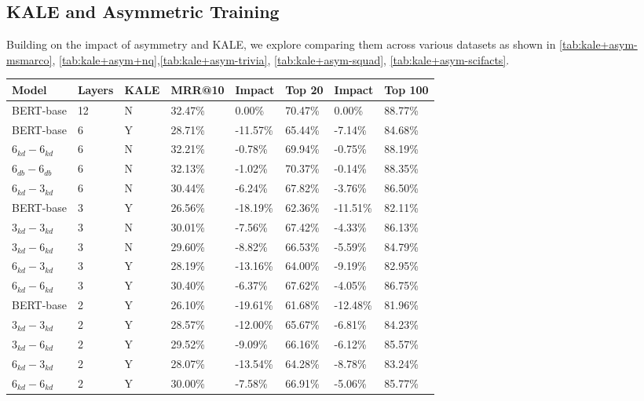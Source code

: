 \subsection{KALE and Asymmetric Training}
\label{sec:kale-asym-full}
Building on the impact of asymmetry and KALE, we explore comparing them across various datasets as shown in \ref{tab:kale+asym-msmarco}, \ref{tab:kale+asym+nq},\ref{tab:kale+asym-trivia}, \ref{tab:kale+asym-squad}, \ref{tab:kale+asym-scifacts}. 
\begin{table*}[!ht]
    \centering
    \begin{tabular}{|l|l|l|l|l|l|l|l|}
    \hline
        Model & Layers & KALE & MRR@10 & Impact & Top 20 & Impact & Top 100 \\ \hline
        BERT-base & 12 & N & 32.47\% & 0.00\% & 70.47\% & 0.00\% & 88.77\% \\ \hline
        BERT-base & 6 & Y & 28.71\% & -11.57\% & 65.44\% & -7.14\% & 84.68\% \\ \hline
        $6_{kd}-6_{kd}$ & 6 & N & 32.21\% & -0.78\% & 69.94\% & -0.75\% & 88.19\% \\ \hline
        $6_{db}-6_{db}$ & 6 & N & 32.13\% & -1.02\% & 70.37\% & -0.14\% & 88.35\% \\ \hline
        $6_{kd}-3_{kd}$ & 6 & N & 30.44\% & -6.24\% & 67.82\% & -3.76\% & 86.50\% \\ \hline
        BERT-base & 3 & Y & 26.56\% & -18.19\% & 62.36\% & -11.51\% & 82.11\% \\ \hline
        $3_{kd}-3_{kd}$ & 3 & N & 30.01\% & -7.56\% & 67.42\% & -4.33\% & 86.13\% \\ \hline
        $3_{kd}-6_{kd}$ & 3 & N & 29.60\% & -8.82\% & 66.53\% & -5.59\% & 84.79\% \\ \hline
        $6_{kd}-3_{kd}$ & 3 & Y & 28.19\% & -13.16\% & 64.00\% & -9.19\% & 82.95\% \\ \hline
        $6_{kd}-6_{kd}$ & 3 & Y & 30.40\% & -6.37\% & 67.62\% & -4.05\% & 86.75\% \\ \hline
        BERT-base & 2 & Y & 26.10\% & -19.61\% & 61.68\% & -12.48\% & 81.96\% \\ \hline
        $3_{kd}-3_{kd}$ & 2 & Y & 28.57\% & -12.00\% & 65.67\% & -6.81\% & 84.23\% \\ \hline
        $3_{kd}-6_{kd}$ & 2 & Y & 29.52\% & -9.09\% & 66.16\% & -6.12\% & 85.57\% \\ \hline
        $6_{kd}-3_{kd}$ & 2 & Y & 28.07\% & -13.54\% & 64.28\% & -8.78\% & 83.24\% \\ \hline
        $6_{kd}-6_{kd}$ & 2 & Y & 30.00\% & -7.58\% & 66.91\% & -5.06\% & 85.77\% \\ \hline

\end{tabular}
\end{table*}
